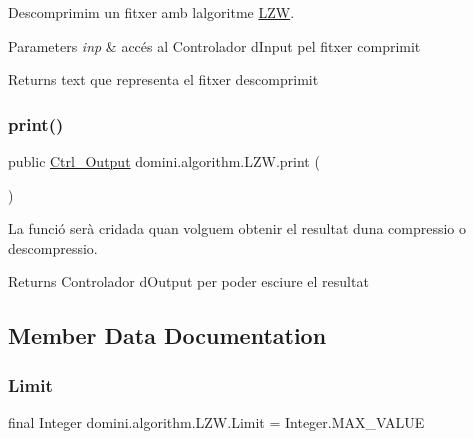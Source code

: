 Descomprimim un fitxer amb l\textquotesingle{}algoritme \hyperlink{classdomini_1_1algorithm_1_1LZW}{L\+ZW}. 


\begin{DoxyParams}{Parameters}
{\em inp} & accés al Controlador d\textquotesingle{}Input pel fitxer comprimit \\
\hline
\end{DoxyParams}
\begin{DoxyReturn}{Returns}
text que representa el fitxer descomprimit 
\end{DoxyReturn}
\mbox{\label{classdomini_1_1algorithm_1_1LZW_a57ba5129e7f26d4cc066195e3d6c9c8c}} 
\subsubsection{\texorpdfstring{print()}{print()}}
{\footnotesize\ttfamily public \hyperlink{classpersistencia_1_1output_1_1Ctrl__Output}{Ctrl\+\_\+\+Output} domini.\+algorithm.\+L\+Z\+W.\+print (\begin{DoxyParamCaption}{ }\end{DoxyParamCaption})\hspace{0.3cm}{\ttfamily [inline]}}



La funció serà cridada quan volguem obtenir el resultat d\textquotesingle{}una compressio o descompressio. 

\begin{DoxyReturn}{Returns}
Controlador d\textquotesingle{}Output per poder esciure el resultat 
\end{DoxyReturn}


\subsection{Member Data Documentation}
\mbox{\label{classdomini_1_1algorithm_1_1LZW_a6d83dbcda4939db767fa0522d40fcc0a}} 
\subsubsection{\texorpdfstring{Limit}{Limit}}
{\footnotesize\ttfamily final Integer domini.\+algorithm.\+L\+Z\+W.\+Limit = Integer.\+M\+A\+X\+\_\+\+V\+A\+L\+UE\hspace{0.3cm}{\ttfamily [package]}}


